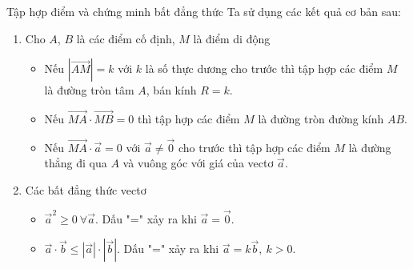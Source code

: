 \begin{dang}{Tập hợp điểm và chứng minh bất đẳng thức}
	Ta sử dụng các kết quả cơ bản sau:\\
	\begin{enumerate}
		\item Cho $A$, $B$ là các điểm cố định, $M$ là điểm di động
		\begin{itemize}
			\item Nếu $\left| \overrightarrow{AM} \right|=k$ với $k$ là số thực dương cho trước thì tập hợp các điểm $M$ là đường tròn tâm $A$, bán kính $R=k$.
			\item Nếu $\overrightarrow{MA}\cdot \overrightarrow{MB}=0$ thì tập hợp các điểm $M$ là đường tròn đường kính $AB$.
			\item Nếu $\overrightarrow{MA}\cdot \overrightarrow{a}=0$ với $\overrightarrow{a}\neq \overrightarrow{0}$ cho trước thì tập hợp các điểm $M$ là đường thẳng đi qua $A$ và vuông góc với giá của vectơ $\overrightarrow{a}$.
		\end{itemize}
		\item Các bất đẳng thức vectơ
		\begin{itemize}
			\item $\overrightarrow{a}^2\geq 0\ \forall \overrightarrow{a}$. Dấu "=" xảy ra khi $\overrightarrow{a}=\overrightarrow{0}$.
			\item $\overrightarrow{a}\cdot \overrightarrow{b}\leq |\overrightarrow{a}|\cdot |\overrightarrow{b}|$. Dấu "=" xảy ra khi $\overrightarrow{a}=k\overrightarrow{b},\ k>0$.
		\end{itemize}
	\end{enumerate}
\end{dang}
